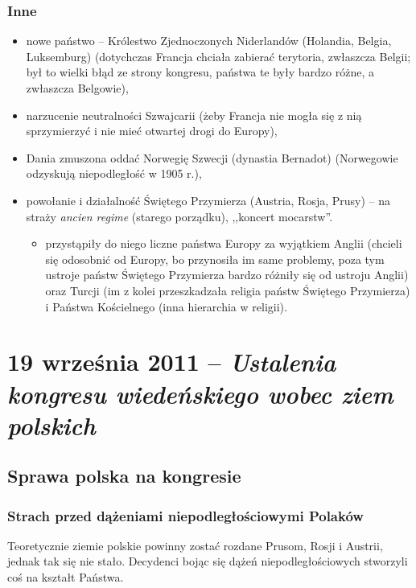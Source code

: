 \documentclass [a4paper, 11pt, oneside]{book}
\begin{document}
        \subsection{Inne} %
        \label{sub:inne}
            \begin{itemize}
                \item nowe państwo -- Królestwo Zjednoczonych Niderlandów (Holandia, Belgia, Luksemburg) (dotychczas Francja chciała zabierać terytoria, zwłaszcza Belgii; był to wielki błąd ze strony kongresu, państwa te były bardzo różne, a zwłaszcza Belgowie),
                \item narzucenie neutralności Szwajcarii (żeby Francja nie mogła się z nią sprzymierzyć i nie mieć otwartej drogi do Europy),
                \item Dania zmuszona oddać Norwegię Szwecji (dynastia Bernadot) (Norwegowie odzyskują niepodległość w 1905 r.),
                \item powołanie i działalność Świętego Przymierza (Austria, Rosja, Prusy) -- na straży \textit{ancien regime} (starego porządku), ,,koncert mocarstw''.
                \begin{itemize}
                    \item przystąpiły do niego liczne państwa Europy za wyjątkiem Anglii (chcieli się odosobnić od Europy, bo przynosiła im same problemy, poza tym ustroje państw Świętego Przymierza bardzo różniły się od ustroju Anglii) oraz Turcji (im z kolei przeszkadzała religia państw Świętego Przymierza) i Państwa Kościelnego (inna hierarchia w religii).
                \end{itemize}
            \end{itemize}
\chapter{19 września 2011 -- \textit{Ustalenia kongresu wiedeńskiego wobec ziem polskich}} %
\label{cha:19_wrze_nia_2011_textit_ustalenia_kongresu_wiede_skiego_wobec_ziem_polskich}
    \section{Sprawa polska na kongresie} %
    \label{sec:sprawa_polska_na_kongresie}
        \subsection{Strach przed dążeniami niepodległościowymi Polaków} %
        \label{sub:strach_przed_d_eniami_niepodleg_o_ciowymi_polak_w}
            Teoretycznie ziemie polskie powinny zostać rozdane Prusom, Rosji i Austrii, jednak tak się nie stało. Decydenci bojąc się dążeń niepodległościowych stworzyli coś na kształt Państwa.
\end{document}
